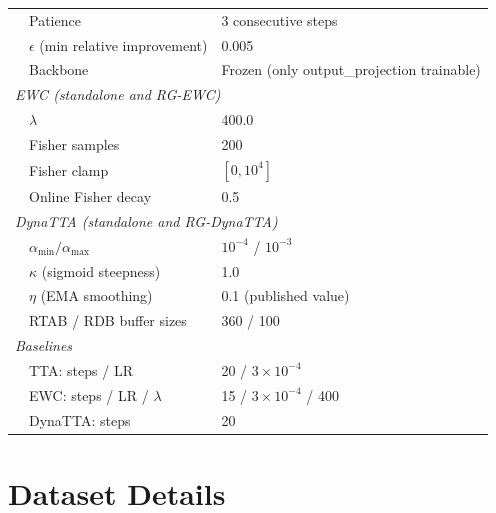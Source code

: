\documentclass[journal]{IEEEtran}
\begin{document}
\begin{table}[t]
\begin{tabular}{lll}
& Patience & 3 consecutive steps \\
& $\epsilon$ (min relative improvement) & 0.005 \\
& Backbone & Frozen (only output\_projection trainable) \\
\midrule
\multicolumn{3}{l}{\emph{EWC (standalone and RG-EWC)}} \\
& $\lambda$ & 400.0 \\
& Fisher samples & 200 \\
& Fisher clamp & $[0, 10^4]$ \\
& Online Fisher decay & 0.5 \\
\midrule
\multicolumn{3}{l}{\emph{DynaTTA (standalone and RG-DynaTTA)}} \\
& $\alpha_{\min} / \alpha_{\max}$ & $10^{-4}$ / $10^{-3}$ \\
& $\kappa$ (sigmoid steepness) & 1.0 \\
& $\eta$ (EMA smoothing) & 0.1 (published value) \\
& RTAB / RDB buffer sizes & 360 / 100 \\
\midrule
\multicolumn{3}{l}{\emph{Baselines}} \\
& TTA: steps / LR & 20 / $3 \times 10^{-4}$ \\
& EWC: steps / LR / $\lambda$ & 15 / $3 \times 10^{-4}$ / 400 \\
& DynaTTA: steps & 20 \\
\bottomrule
\end{tabular}
\end{table}

\section{Dataset Details}
\label{app:datasets}

\begin{table}[t]
\centering
\caption{Dataset summary.}
\label{tab:datasetdesc}
\small
{}%
\end{table}
\end{document}
